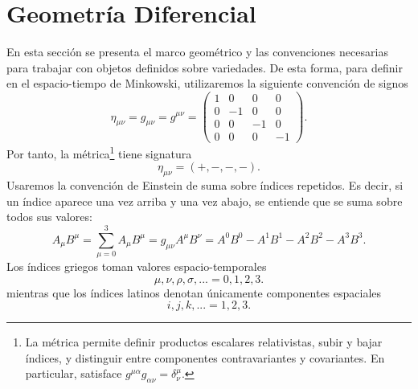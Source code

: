 \documentclass[a4paper,11pt]{book} %
\begin{document}
\section{Geometría Diferencial}
\noindent
En esta sección se presenta el marco geométrico y las convenciones necesarias para trabajar con objetos definidos sobre variedades. De esta forma, para definir en el espacio-tiempo de Minkowski, utilizaremos la siguiente convención de signos
\begin{equation}
    \eta_{\mu\nu} = g_{\mu\nu} = g^{\mu\nu}
    =
    \begin{pmatrix}
        1 & 0 & 0 & 0 \\
        0 & -1 & 0 & 0 \\
        0 & 0 & -1 & 0 \\
        0 & 0 & 0 & -1
    \end{pmatrix}.
\end{equation}\noindent
Por tanto, la métrica\footnote{La métrica permite definir productos escalares relativistas, subir y bajar
índices, y distinguir entre componentes contravariantes y covariantes. En
particular, satisface $g^{\mu\alpha}g_{\alpha\nu} = \delta^\mu_{\nu}$.} tiene signatura
\begin{equation}
    \eta_{\mu\nu} = (+,-,-,-).
\end{equation}
\newpage\noindent
Usaremos la convención de Einstein de suma sobre índices repetidos. Es decir,
si un índice aparece una vez arriba y una vez abajo, se entiende que se suma
sobre todos sus valores:
\begin{equation}
A_\mu B^\mu
=
\sum_{\mu=0}^{3} A_\mu B^\mu
=
g_{\mu\nu} A^\mu B^\nu
=
A^0B^0 - A^1B^1 - A^2B^2 - A^3B^3.
\end{equation}
\noindent
Los índices griegos toman valores espacio-temporales
\[
    \mu,\nu,\rho,\sigma,... = 0,1,2,3.
\]
mientras que los índices latinos denotan únicamente componentes espaciales
\[
    i,j,k, ... = 1,2,3.
\]
\end{document}
